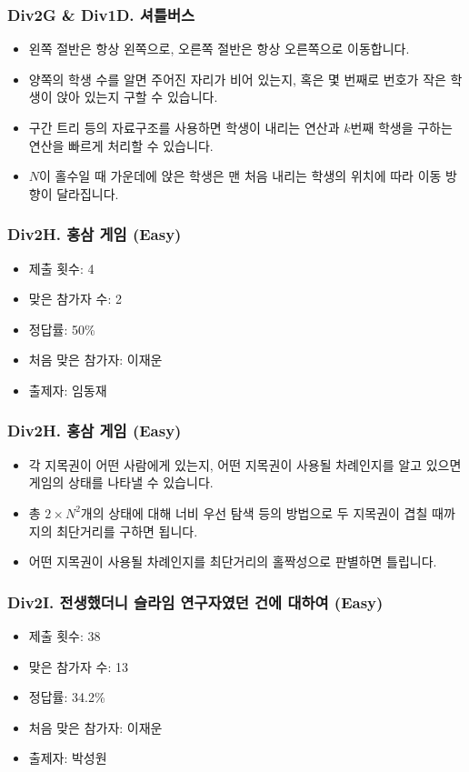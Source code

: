 \documentclass[xetex]{beamer}
\begin{document}
\begin{frame}
  \frametitle{Div2G \& Div1D. 셔틀버스}
  \begin{itemize}
    \item 왼쪽 절반은 항상 왼쪽으로, 오른쪽 절반은 항상 오른쪽으로 이동합니다.
    \item 양쪽의 학생 수를 알면 주어진 자리가 비어 있는지, 혹은 몇 번째로 번호가 작은 학생이 앉아 있는지 구할 수 있습니다.
    \item 구간 트리 등의 자료구조를 사용하면 학생이 내리는 연산과 $k$번째 학생을 구하는 연산을 빠르게 처리할 수 있습니다.
    \item $N$이 홀수일 때 가운데에 앉은 학생은 맨 처음 내리는 학생의 위치에 따라 이동 방향이 달라집니다.
  \end{itemize}
\end{frame}

\begin{frame}
  \frametitle{Div2H. 홍삼 게임 (Easy)}
  \begin{itemize}
    \item 제출 횟수: 4
    \item 맞은 참가자 수: 2
    \item 정답률: 50\%
    \item 처음 맞은 참가자: 이재운
    \item 출제자: 임동재
  \end{itemize}
\end{frame}

\begin{frame}
  \frametitle{Div2H. 홍삼 게임 (Easy)}
  \begin{itemize}
    \item 각 지목권이 어떤 사람에게 있는지, 어떤 지목권이 사용될 차례인지를 알고 있으면 게임의 상태를 나타낼 수 있습니다.
    \item 총 $2 \times N^{2}$개의 상태에 대해 너비 우선 탐색 등의 방법으로 두 지목권이 겹칠 때까지의 최단거리를 구하면 됩니다.
    \item 어떤 지목권이 사용될 차례인지를 최단거리의 홀짝성으로 판별하면 틀립니다.
  \end{itemize}
\end{frame}

\begin{frame}
  \frametitle{Div2I. 전생했더니 슬라임 연구자였던 건에 대하여 (Easy)}
  \begin{itemize}
    \item 제출 횟수: 38
    \item 맞은 참가자 수: 13
    \item 정답률: 34.2\%
    \item 처음 맞은 참가자: 이재운
    \item 출제자: 박성원
  \end{itemize}
\end{frame}
\end{document}
